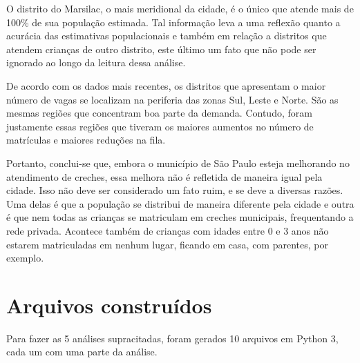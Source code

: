 \documentclass[12pt, a4paper]{article}
\begin{document}
O distrito do Marsilac, o mais meridional da cidade, é o único que atende mais de 100\% de sua população estimada. Tal informação leva a uma reflexão quanto a acurácia das estimativas populacionais e também em relação a distritos que atendem crianças de outro distrito, este último um fato que não pode ser ignorado ao longo da leitura dessa análise.

De acordo com os dados mais recentes, os distritos que apresentam o maior número de vagas se localizam na periferia das zonas Sul, Leste e Norte. São as mesmas regiões que concentram boa parte da demanda. Contudo, foram justamente essas regiões que tiveram os maiores aumentos no número de matrículas e maiores reduções na fila.

Portanto, conclui-se que, embora o município de São Paulo esteja melhorando no atendimento de creches, essa melhora não é refletida de maneira igual pela cidade. Isso não deve ser considerado um fato ruim, e se deve a diversas razões. Uma delas é que a população se distribui de maneira diferente pela cidade e outra é que nem todas as crianças se matriculam em creches municipais, frequentando a rede privada. Acontece também de crianças com idades entre 0 e 3 anos não estarem matriculadas em nenhum lugar, ficando em casa, com parentes, por exemplo.

\section{Arquivos construídos}

Para fazer as 5 análises supracitadas, foram gerados 10 arquivos em Python 3, cada um com uma parte da análise.
\end{document}
